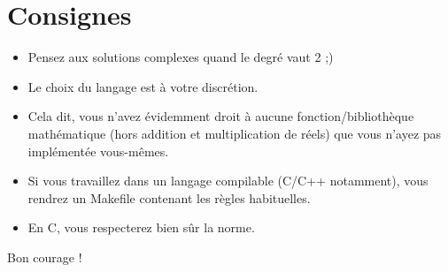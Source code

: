 \documentclass{42}
\begin{document}
\chapter{Consignes}

	\begin{itemize}

		\item Pensez aux solutions complexes quand le degré vaut 2 ;)

		\item Le choix du langage est à votre discrétion.

		\item Cela dit, vous n'avez évidemment droit à aucune
          fonction/biblioth\`eque mathématique (hors addition et
          multiplication de réels) que vous n'ayez pas implémentée
          vous-mêmes.

		\item Si vous travaillez dans un langage compilable (C/C++
          notamment), vous rendrez un Makefile contenant les règles
          habituelles.

		\item En C, vous respecterez bien sûr la norme.\\

	\end{itemize}

    Bon courage !
\end{document}

